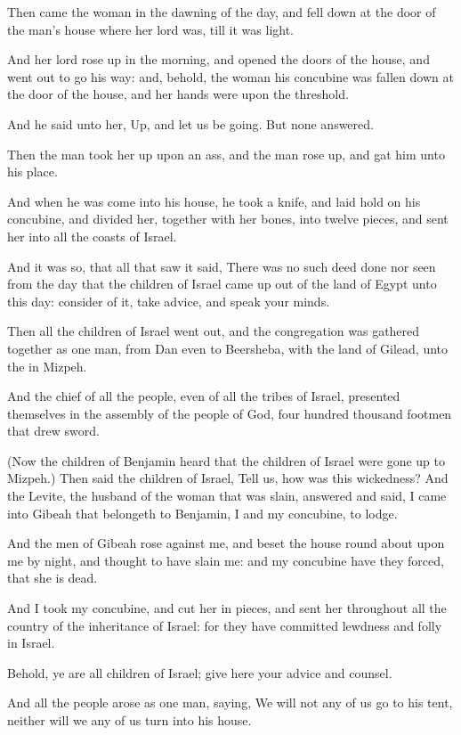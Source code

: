 \Verse Then came the woman in the dawning of the day, and fell down at the door of the man's house where her lord was, till it was light.

\Verse And her lord rose up in the morning, and opened the doors of the house, and went out to go his way: and, behold, the woman his concubine was fallen down at the door of the house, and her hands were upon the threshold.

\Verse And he said unto her, Up, and let us be going. But none answered.

Then the man took her up upon an ass, and the man rose up, and gat him unto his place.

\Verse And when he was come into his house, he took a knife, and laid hold on his concubine, and divided her, together with her bones, into twelve pieces, and sent her into all the coasts of Israel.

\Verse And it was so, that all that saw it said, There was no such deed done nor seen from the day that the children of Israel came up out of the land of Egypt unto this day: consider of it, take advice, and speak your minds.


\Chapter
\Verse Then all the children of Israel went out, and the congregation was gathered together as one man, from Dan even to Beersheba, with the land of Gilead, unto the \LORD in Mizpeh.

\Verse And the chief of all the people, even of all the tribes of Israel, presented themselves in the assembly of the people of God, four hundred thousand footmen that drew sword.

\Verse (Now the children of Benjamin heard that the children of Israel were gone up to Mizpeh.) Then said the children of Israel, Tell us, how was this wickedness?  \Verse And the Levite, the husband of the woman that was slain, answered and said, I came into Gibeah that belongeth to Benjamin, I and my concubine, to lodge.

\Verse And the men of Gibeah rose against me, and beset the house round about upon me by night, and thought to have slain me: and my concubine have they forced, that she is dead.

\Verse And I took my concubine, and cut her in pieces, and sent her throughout all the country of the inheritance of Israel: for they have committed lewdness and folly in Israel.

\Verse Behold, ye are all children of Israel; give here your advice and counsel.

\Verse And all the people arose as one man, saying, We will not any of us go to his tent, neither will we any of us turn into his house.

